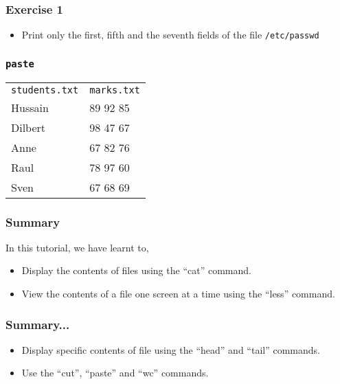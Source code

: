 \documentclass[17pt,compress]{beamer}
\begin{document}
\begin{frame}
  \frametitle{Exercise 1}
  \begin{itemize}
  \item Print only the first, fifth and the seventh fields of the file \verb~/etc/passwd~
  \end{itemize}
\end{frame}

\begin{frame}[fragile]
  \frametitle{\texttt{paste}}
      \begin{center}
      \begin{tabular}{l|l}
        \verb~students.txt~  &  \verb~marks.txt~  \\
        Hussain              &  89 92 85          \\
        Dilbert              &  98 47 67          \\
        Anne                 &  67 82 76          \\
        Raul                 &  78 97 60          \\
        Sven                 &  67 68 69          \\
      \end{tabular}
    \end{center}
\end{frame}

\begin{frame}
\frametitle{Summary}
\label{sec-8}

  In this tutorial, we have learnt to,

\begin{itemize}
\item Display the contents of files using the ``cat'' command.
\item View the contents of a file one screen at a time using the 
      ``less'' command.
\end{itemize}
\end{frame}

\begin{frame}
\frametitle{Summary...}
\begin{itemize}
\item Display specific contents of file using the ``head'' and 
      ``tail'' commands.
\item Use the ``cut'', ``paste'' and ``wc'' commands.
\end{itemize}
\end{frame}
\end{document}
